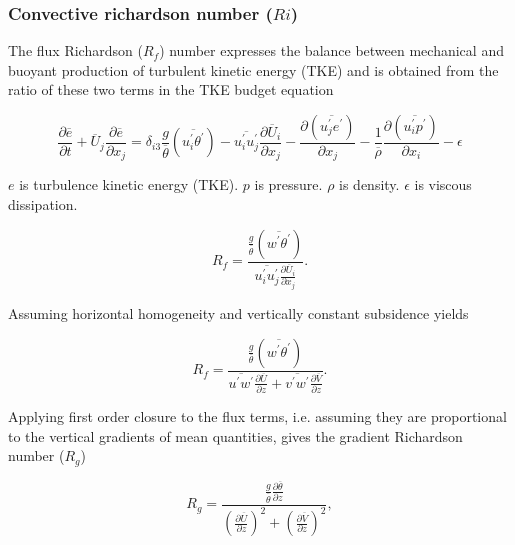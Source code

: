 \subsubsection{Convective richardson number ($Ri$)}
\label{subsubsec:}

The flux Richardson ($R_{f}$) number expresses the balance between mechanical and buoyant production of turbulent kinetic energy (TKE) and is obtained from the ratio of these two terms in the TKE budget equation 

\begin{equation}
\frac{\partial \overline{e}}{\partial t} + \overline{U}_{j} \frac{\partial \overline{e}}{\partial x_{j}} = \delta_{i3}  \frac{g}{\overline{\theta}} \left( \overline{u_{i}^{'}\theta^{'}} \right) - \overline{u_{i}^{'}u_{j}^{'}}\frac{\partial \overline{U}_{i}}{\partial x_{j}} - \frac{ \partial \left( \overline{u_{j}^{'}e^{'}} \right)}{\partial x_{j}} - \frac{1}{\overline{\rho}} \frac{\partial \left( \overline{u_{i}^{'} p^{'}} \right) }{\partial x_{i}} - \epsilon
\end{equation}

$e$ is turbulence kinetic energy (TKE).  $p$ is pressure.  $\rho$ is density.  $\epsilon$ is viscous dissipation.

\begin{equation}
R_{f} = \frac{\frac{g}{\overline{\theta}}( \overline{w^{'}\theta^{'}})}{\overline{u_{i}^{'}u_{j}^{'}}\frac{\partial \overline{U}_{i}}{\partial x_{j}}}.
\end{equation}
 
Assuming horizontal homogeneity and vertically constant subsidence yields
  
\begin{equation}
R_{f} = \frac{\frac{g}{\overline{\theta}} \left( \overline{w^{'}\theta^{'}} \right)}{\overline{u^{'}w^{'}}\frac{\partial \overline{U}}{\partial z} + \overline{v^{'}w^{'}}\frac{\partial \overline{V}}{\partial z}}.
\end{equation}

Applying first order closure to the flux terms, i.e. assuming they are proportional to the vertical gradients of mean quantities, gives the gradient Richardson number ($R_{g}$)

\begin{equation}
R_{g} = \frac{ \frac{g}{\overline{\theta}} \frac{\partial \overline{\theta}}{\partial z}}{\left( \frac{ \partial \overline{U}}{\partial z} \right)^{2} + \left( \frac{\partial \overline{V}}{\partial z} \right)^{2}}, 
\end{equation}

